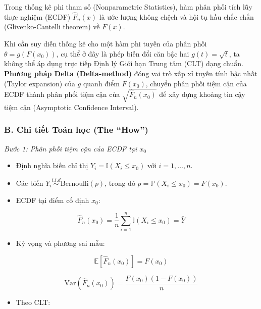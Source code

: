 \documentclass[12pt,a4paper]{article}
\begin{document}
Trong thống kê phi tham số (Nonparametric Statistics), hàm phân phối tích lũy thực nghiệm (ECDF) \(\widehat{F}_n(x)\) là ước lượng không chệch và hội tụ hầu chắc chắn (Glivenko-Cantelli theorem) về \(F(x)\).

Khi cần suy diễn thống kê cho một hàm phi tuyến của phân phối \(\theta = g(F(x_0))\), cụ thể ở đây là phép biến đổi căn bậc hai \(g(t) = \sqrt{t}\), ta không thể áp dụng trực tiếp Định lý Giới hạn Trung tâm (CLT) dạng chuẩn. \textbf{Phương pháp Delta (Delta-method)} đóng vai trò xấp xỉ tuyến tính bậc nhất (Taylor expansion) của \(g\) quanh điểm \(F(x_0)\), chuyển phân phối tiệm cận của ECDF thành phân phối tiệm cận của \(\sqrt{\widehat{F}_n(x_0)}\) để xây dựng khoảng tin cậy tiệm cận (Asymptotic Confidence Interval).

\subsubsection{B. Chi tiết Toán học (The ``How'')}\label{b.-chi-tiux1ebft-touxe1n-hux1ecdc-the-how}

\emph{Bước 1: Phân phối tiệm cận của ECDF tại \(x_0\)}

\begin{itemize}

\item
  Định nghĩa biến chỉ thị \(Y_i = \mathbb{I}(X_i \le x_0)\) với \(i = 1, \dots, n\).
\item
  Các biến \(Y_i \overset{i.i.d}{\sim} \text{Bernoulli}(p)\), trong đó \(p = \mathbb{P}(X_i \le x_0) = F(x_0)\).
\item
  ECDF tại điểm cố định \(x_0\):
\end{itemize}

\[\widehat{F}_n(x_0) = \frac{1}{n} \sum_{i=1}^n \mathbb{I}(X_i \le x_0) = \bar{Y}\]

\begin{itemize}

\item
  Kỳ vọng và phương sai mẫu:
\end{itemize}

\[\mathbb{E}[\widehat{F}_n(x_0)] = F(x_0)\]

\[\text{Var}(\widehat{F}_n(x_0)) = \frac{F(x_0)(1 - F(x_0))}{n}\]

\begin{itemize}

\item
  Theo CLT:
\end{itemize}
\end{document}

